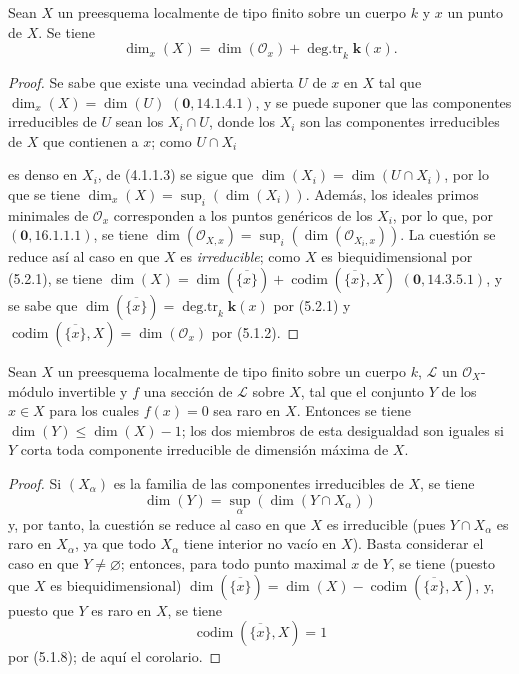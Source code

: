\begin{corollary}[5.2.3]
Sean $X$ un preesquema localmente de tipo finito sobre un cuerpo $k$ y $x$ un
punto de $X$. Se tiene
\begin{equation}
\dim_x(X)=\dim(\mathcal O_x)+\operatorname{deg.tr}_k \boldsymbol{k}(x).
\tag{5.2.3.1}\label{IV.2.5.2.3.1-fr}
\end{equation}
\end{corollary}

\begin{proof}
Se sabe que existe una vecindad abierta $U$ de $x$ en $X$ tal que
$\dim_x(X)=\dim(U)$ $(\mathbf{0},14.1.4.1)$, y se puede suponer que las componentes
irreducibles de $U$ sean los $X_i\cap U$, donde los $X_i$ son las
componentes irreducibles de $X$ que contienen a $x$; como $U\cap X_i$


es denso en $X_i$, de (4.1.1.3) se sigue que
$\dim(X_i)=\dim(U\cap X_i)$, por lo que se tiene
$\dim_x(X)=\sup_i(\dim(X_i))$. Además, los ideales primos minimales de
$\mathcal O_x$ corresponden a los puntos genéricos de los $X_i$, por lo que,
por $(\mathbf{0},16.1.1.1)$, se tiene
$\dim(\mathcal O_{X,x})=\sup_i(\dim(\mathcal O_{X_i,x}))$. La cuestión se reduce así
al caso en que $X$ es \emph{irreducible}; como $X$ es biequidimensional por
(5.2.1), se tiene
$\dim(X)=\dim(\overline{\{x\}})+\operatorname{codim}(\overline{\{x\}},X)$
$(\mathbf{0},14.3.5.1)$, y se sabe que
$\dim(\overline{\{x\}})=\operatorname{deg.tr}_k \boldsymbol{k}(x)$ por (5.2.1) y
$\operatorname{codim}(\overline{\{x\}},X)=\dim(\mathcal O_x)$ por (5.1.2).
\end{proof}

\begin{corollary}[5.2.4]
\label{IV.2.5.2.4-fr}
Sean $X$ un preesquema localmente de tipo finito sobre un cuerpo $k$,
$\mathcal L$ un $\mathcal O_X$-módulo invertible y $f$ una sección de
$\mathcal L$ sobre $X$, tal que el conjunto $Y$ de los $x\in X$ para los
cuales $f(x)=0$ sea raro en $X$. Entonces se tiene
$\dim(Y)\leq\dim(X)-1$; los dos miembros de esta desigualdad son iguales si
$Y$ corta toda componente irreducible de dimensión máxima de $X$.
\end{corollary}

\begin{proof}
Si $(X_\alpha)$ es la familia de las componentes irreducibles de $X$, se
tiene
\[
\dim(Y)=\sup_\alpha(\dim(Y\cap X_\alpha))
\]
y, por tanto, la cuestión se reduce al caso en que $X$ es irreducible (pues
$Y\cap X_\alpha$ es raro en $X_\alpha$, ya que todo $X_\alpha$ tiene interior
no vacío en $X$). Basta considerar el caso en que $Y\ne\varnothing$; entonces,
para todo punto maximal $x$ de $Y$, se tiene (puesto que $X$ es
biequidimensional)
$\dim(\overline{\{x\}})=\dim(X)-\operatorname{codim}(\overline{\{x\}},X)$,
y, puesto que $Y$ es raro en $X$, se tiene
\[
\operatorname{codim}(\overline{\{x\}},X)=1
\] por (5.1.8); de aquí el
corolario.
\end{proof}

